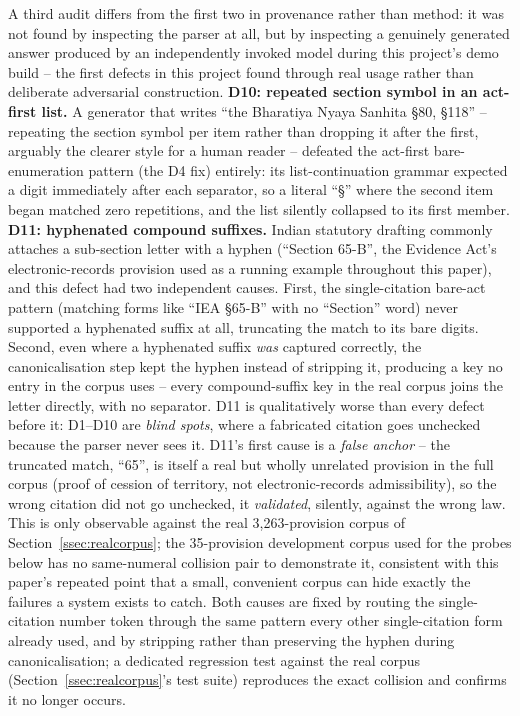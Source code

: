 \documentclass[conference]{IEEEtran}
\begin{document}
A third audit differs from the first two in provenance rather than method: it
was not found by inspecting the parser at all, but by inspecting a genuinely
generated answer produced by an independently invoked model during this
project's demo build -- the first defects in this project found through real
usage rather than deliberate adversarial construction. \textbf{D10: repeated
section symbol in an act-first list.} A generator that writes ``the
Bharatiya Nyaya Sanhita \S80, \S118'' -- repeating the section symbol per
item rather than dropping it after the first, arguably the clearer style for
a human reader -- defeated the act-first bare-enumeration pattern (the D4
fix) entirely: its list-continuation grammar expected a digit immediately
after each separator, so a literal ``\S'' where the second item began matched
zero repetitions, and the list silently collapsed to its first member.
\textbf{D11: hyphenated compound suffixes.} Indian statutory drafting
commonly attaches a sub-section letter with a hyphen (``Section 65-B'', the
Evidence Act's electronic-records provision used as a running example
throughout this paper), and this defect had two independent causes. First,
the single-citation bare-act pattern (matching forms like ``IEA \S65-B''
with no ``Section'' word) never supported a hyphenated suffix at all,
truncating the match to its bare digits. Second, even where a hyphenated
suffix \emph{was} captured correctly, the canonicalisation step kept the
hyphen instead of stripping it, producing a key no entry in the corpus uses
-- every compound-suffix key in the real corpus joins the letter directly,
with no separator. D11 is qualitatively worse than every defect before it:
D1--D10 are \emph{blind spots}, where a fabricated citation goes unchecked
because the parser never sees it. D11's first cause is a \emph{false
anchor} -- the truncated match, ``65'', is itself a real but wholly
unrelated provision in the full corpus (proof of cession of territory, not
electronic-records admissibility), so the wrong citation did not go
unchecked, it \emph{validated}, silently, against the wrong law. This is
only observable against the real 3{,}263-provision corpus of
Section~\ref{ssec:realcorpus}; the 35-provision development corpus used for
the probes below has no same-numeral collision pair to demonstrate it,
consistent with this paper's repeated point that a small, convenient corpus
can hide exactly the failures a system exists to catch. Both causes are
fixed by routing the single-citation number token through the same pattern
every other single-citation form already used, and by stripping rather than
preserving the hyphen during canonicalisation; a dedicated regression test
against the real corpus (Section~\ref{ssec:realcorpus}'s test suite)
reproduces the exact collision and confirms it no longer occurs.
\end{document}
